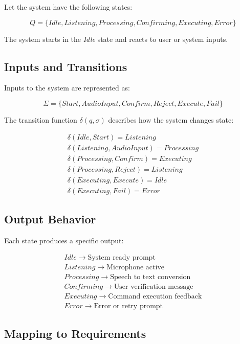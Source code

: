 \documentclass[11pt]{article}
\begin{document}
Let the system have the following states:

\[
Q = \{Idle, Listening, Processing, Confirming, Executing, Error\}
\]

The system starts in the \textit{Idle} state and reacts to user or system inputs.

\subsection{Inputs and Transitions}

Inputs to the system are represented as:

\[
\Sigma = \{Start, AudioInput, Confirm, Reject, Execute, Fail\}
\]

The transition function $\delta(q, \sigma)$ describes how the system changes state:

\[
\begin{array}{ll}
\delta(Idle, Start) = Listening \\
\delta(Listening, AudioInput) = Processing \\
\delta(Processing, Confirm) = Executing \\
\delta(Processing, Reject) = Listening \\
\delta(Executing, Execute) = Idle \\
\delta(Executing, Fail) = Error
\end{array}
\]

\subsection{Output Behavior}

Each state produces a specific output:

\[
\begin{array}{ll}
Idle \rightarrow \text{System ready prompt} \\
Listening \rightarrow \text{Microphone active} \\
Processing \rightarrow \text{Speech to text conversion} \\
Confirming \rightarrow \text{User verification message} \\
Executing \rightarrow \text{Command execution feedback} \\
Error \rightarrow \text{Error or retry prompt}
\end{array}
\]

\subsection{Mapping to Requirements}
\end{document}
